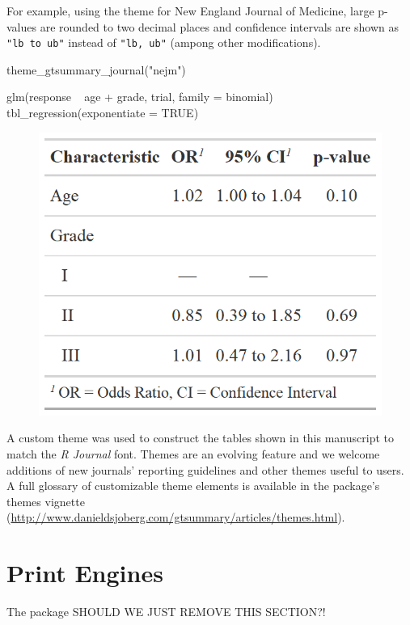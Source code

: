 For example, using the theme for New England Journal of Medicine, large p-values are rounded to two decimal places and confidence intervals are shown as \texttt{"lb to ub"} instead of \texttt{"lb, ub"} (ampong other modifications). 

\begin{example}
theme_gtsummary_journal("nejm")

glm(response ~ age + grade, trial, family = binomial) %
  tbl_regression(exponentiate = TRUE)
\end{example}

\begin{figure}[h!]
  \includegraphics[scale=0.28]{nejm.png}
  \centering
\end{figure}

A custom theme was used to construct the  tables shown in this manuscript to match the \emph{R Journal} font. 
Themes are an evolving feature and we welcome additions of new journals' reporting guidelines and other themes useful to users.
A full glossary of customizable theme elements is available in the package's themes vignette (\url{http://www.danieldsjoberg.com/gtsummary/articles/themes.html}).

\section{Print Engines}

The  package 
SHOULD WE JUST REMOVE THIS SECTION?!

